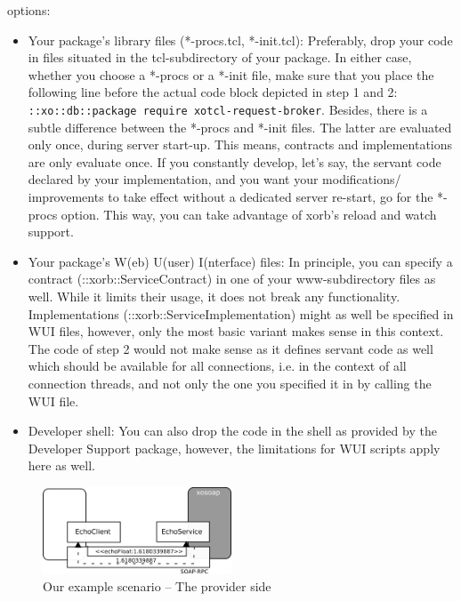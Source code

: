 \begin{enumerate}
    options:
    \begin{itemize}
    \item Your package's library files (*-procs.tcl, *-init.tcl):
      Preferably, drop your code in files situated in the tcl-subdirectory
      of your package. In either case, whether you choose a *-procs or a
      *-init file, make sure that you place the following line before the
      actual code block depicted in step 1 and 2:
      \lstinline[breaklines=true]!::xo::db::package require xotcl-request-broker!. Besides, there is a subtle difference between
      the *-procs and *-init files. The latter are evaluated only once,
      during server start-up. This means, contracts and implementations are
      only evaluate once. If you constantly develop, let's say, the servant
      code declared by your implementation, and you want your modifications/
      improvements to take effect without a dedicated server re-start, go
      for the *-procs option. This way, you can take advantage of xorb's
      reload and watch support.
    \item Your package's W(eb) U(user) I(nterface) files: In principle,
      you can specify a contract (::xorb::ServiceContract) in one of your
      www-subdirectory files as well. While it limits their usage, it does
      not break any functionality. Implementations
      (::xorb::ServiceImplementation) might as well be specified in WUI
      files, however, only the most basic variant makes sense in this
      context. The code of step 2 would not make sense as it defines servant
      code as well which should be available for all connections, i.e. in
      the context of all connection threads, and not only the one you
      specified it in by calling the WUI file.
    \item Developer shell: You can also drop the code in the shell as
      provided by the Developer Support package, however, the limitations
      for WUI scripts apply here as well.
    \end{itemize}
    
  \end{enumerate}
  \begin{figure}[htbp]
    \begin{center}
      \includegraphics[width=0.5\textwidth]{img/provider.png}
      \caption{Our example scenario -- The provider side}
      \label{fig:quickstart:xosoap:2}
    \end{center}
  \end{figure}
  
